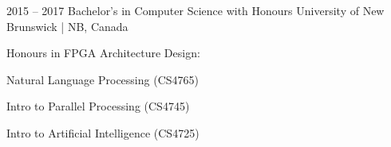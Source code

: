 \entrys
{2015 -- 2017}
{Bachelor's in Computer Science with Honours}
{University of New Brunswick | NB, Canada}
{Honours in FPGA Architecture Design:
\begin{tightemize}
\item Natural Language Processing (CS4765)

\item Intro to Parallel Processing (CS4745)

\item Intro to Artificial Intelligence (CS4725)

\end{tightemize}
}


